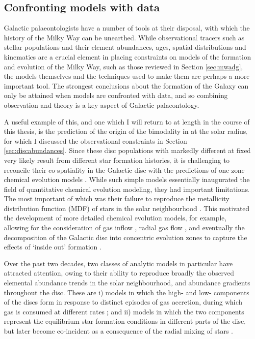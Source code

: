 \subsection{Confronting models with data}

Galactic palaeontologists have a number of tools at their disposal, with which the history of the Milky Way can be unearthed. While observational tracers such as stellar populations and their element abundances, ages, spatial distributions and kinematics are a crucial element in placing constraints on models of the formation and evolution of the Milky Way, such as those reviewed in Section \ref{sec:mwadg}, the models themselves and the techniques used to make them are perhaps a more important tool. The strongest conclusions about the formation of the Galaxy can only be attained when models are confronted with data, and so combining observation and theory is a key aspect of Galactic palaeontology.

A useful example of this, and one which I will return to at length in the course of this thesis, is the prediction of the origin of the bimodality in \afe{} at the solar radius, for which I discussed the observational constraints in Section \ref{sec:discabundances}. Since these disc populations with markedly different \afe{} at fixed \feh{} very likely result from different star formation histories, it is challenging to reconcile their co-spatiality in the Galactic disc with the predictions of one-zone chemical evolution models \citep[e.g.,][]{1959ApJ...129..243S,1963ApJ...137..758S}. While such simple models essentially inaugurated the field of quantitative chemical evolution modeling, they had important limitations.  The most important of which was their failure to reproduce the metallicity distribution function (MDF) of stars in the solar neighbourhood \citep[known as the `G-dwarf problem',][]{1962AJ.....67..486V,1963ApJ...137..758S}. This motivated the development of more detailed chemical evolution models, for example, allowing for the consideration of gas inflow \citep{1972Natur.236...21L,1977ApJ...216..548T}, radial gas flow \citep[e.g.][]{2000A&A...355..929P}, and eventually the decomposition of the Galactic disc into concentric evolution zones to capture the effects of `inside out' formation \citep[e.g.][]{1976MNRAS.176...31L,1980FCPh....5..287T,1989MNRAS.239..885M}. 

Over the past two decades, two classes of analytic models in particular have attracted attention, owing to their ability to reproduce broadly the observed elemental abundance trends in the solar neighbourhood, and abundance gradients throughout the disc. These are i) models in which the high- and low-\afe{} components of the discs form in response to distinct episodes of gas accretion, during which gas is consumed at different rates \citep{1997ApJ...477..765C,2001ApJ...554.1044C,2009IAUS..254..191C}; and ii) models in which the two components represent the equilibrium star formation conditions in different parts of the disc, but later become co-incident as a consequence of the radial mixing of stars \citep{2009MNRAS.396..203S,2009MNRAS.399.1145S}. 

